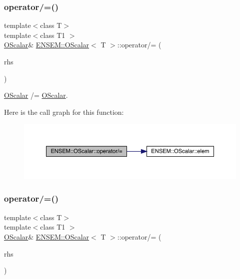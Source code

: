 \subsubsection{\texorpdfstring{operator/=()}{operator/=()}\hspace{0.1cm}{\footnotesize\ttfamily [1/3]}}
{\footnotesize\ttfamily template$<$class T$>$ \\
template$<$class T1 $>$ \\
\mbox{\hyperlink{classENSEM_1_1OScalar}{O\+Scalar}}\& \mbox{\hyperlink{classENSEM_1_1OScalar}{E\+N\+S\+E\+M\+::\+O\+Scalar}}$<$ T $>$\+::operator/= (\begin{DoxyParamCaption}\item[{const \mbox{\hyperlink{classENSEM_1_1OScalar}{O\+Scalar}}$<$ T1 $>$ \&}]{rhs }\end{DoxyParamCaption})\hspace{0.3cm}{\ttfamily [inline]}}



\mbox{\hyperlink{classENSEM_1_1OScalar}{O\+Scalar}} /= \mbox{\hyperlink{classENSEM_1_1OScalar}{O\+Scalar}}. 

Here is the call graph for this function\+:
\nopagebreak
\begin{figure}[H]
\begin{center}
\leavevmode
\includegraphics[width=350pt]{da/d80/classENSEM_1_1OScalar_a1e0517e29754a8acb284c3ac266c2b2c_cgraph}
\end{center}
\end{figure}
\mbox{\label{classENSEM_1_1OScalar_a1e0517e29754a8acb284c3ac266c2b2c}} 
\subsubsection{\texorpdfstring{operator/=()}{operator/=()}\hspace{0.1cm}{\footnotesize\ttfamily [2/3]}}
{\footnotesize\ttfamily template$<$class T$>$ \\
template$<$class T1 $>$ \\
\mbox{\hyperlink{classENSEM_1_1OScalar}{O\+Scalar}}\& \mbox{\hyperlink{classENSEM_1_1OScalar}{E\+N\+S\+E\+M\+::\+O\+Scalar}}$<$ T $>$\+::operator/= (\begin{DoxyParamCaption}\item[{const \mbox{\hyperlink{classENSEM_1_1OScalar}{O\+Scalar}}$<$ T1 $>$ \&}]{rhs }\end{DoxyParamCaption})\hspace{0.3cm}{\ttfamily [inline]}}



